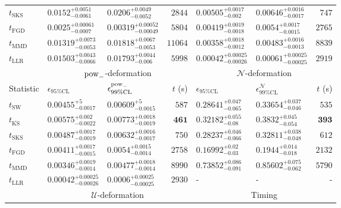 \begin{tabular}{l|llr|llr}
	$t_{\mathrm{SKS}}$ & $0.0152_{-0.0061}^{+0.0051}$ & $0.0206_{-0.0052}^{+0.0049}$ & $2844$ & $0.00505_{-0.002}^{+0.0017}$ & $0.00646_{-0.0017}^{+0.0016}$ & $747$ \\
	$t_{\mathrm{FGD}}$ & ${\mathbf{0.0025_{-0.0007}^{+0.00061}}}$ & ${\mathbf{0.00319_{-0.00049}^{+0.00052}}}$ & $5804$ & $0.00419_{-0.0018}^{+0.0019}$ & $0.0054_{-0.0015}^{+0.0017}$ & $2765$ \\
	$t_{\mathrm{MMD}}$ & $0.01319_{-0.0053}^{+0.0073}$ & $0.01818_{-0.0053}^{+0.0067}$ & $11064$ & ${\mathbf{0.00358_{-0.0012}^{+0.0018}}}$ & ${\mathbf{0.00483_{-0.0013}^{+0.0016}}}$ & $8839$ \\
	$t_{\mathrm{LLR}}$ & $0.01503_{-0.0066}^{+0.0043}$ & $0.01793_{-0.006}^{+0.0044}$ & $5998$ & $0.00042_{-0.00026}^{+0.00025}$ & $0.00061_{-0.00025}^{+0.00025}$ & $2919$ \\
	\toprule
	\multicolumn{1}{c}{} & \multicolumn{3}{c}{$\rm{pow}_{-}$-deformation} & \multicolumn{3}{c}{$\mathcal{N}$-deformation} \\
	Statistic & $\epsilon_{95\%\mathrm{CL}}$ & $\epsilon^  {\rm{pow}_{-}}_{99\%\mathrm{CL}}$ & $t$ (s) & $\epsilon_{95\%\mathrm{CL}}$ & $\epsilon^    {\mathcal{N}}_{99\%\mathrm{CL}}$ & $t$ (s) \\
	\midrule
	$t_{\mathrm{SW}}$ & $0.00455_{-0.0017}^{+5}$ & $0.00609_{-0.0015}^{+5}$ & $587$ & $0.28641_{-0.065}^{+0.047}$ & $0.33654_{-0.046}^{+0.037}$ & $535$ \\
	$t_{\overline{\mathrm{KS}}}$ & $0.00575_{-0.0022}^{+0.002}$ & $0.00773_{-0.0019}^{+0.0018}$ & ${\mathbf{461}}$ & $0.32182_{-0.08}^{+0.055}$ & $0.3832_{-0.054}^{+0.045}$ & ${\mathbf{393}}$ \\
	$t_{\mathrm{SKS}}$ & $0.00487_{-0.0019}^{+0.0017}$ & $0.00632_{-0.0017}^{+0.0016}$ & $750$ & $0.28237_{-0.066}^{+0.046}$ & $0.32811_{-0.048}^{+0.038}$ & $612$ \\
	$t_{\mathrm{FGD}}$ & $0.00411_{-0.0015}^{+0.0017}$ & $0.0054_{-0.0014}^{+0.0015}$ & $2758$ & ${\mathbf{0.16992_{-0.03}^{+0.02}}}$ & ${\mathbf{0.1944_{-0.018}^{+0.014}}}$ & $2132$ \\
	$t_{\mathrm{MMD}}$ & ${\mathbf{0.00346_{-0.0014}^{+0.0019}}}$ & ${\mathbf{0.00477_{-0.0014}^{+0.0018}}}$ & $8990$ & $0.73852_{-0.091}^{+0.086}$ & $0.85602_{-0.062}^{+0.075}$ & $5790$ \\
	$t_{\mathrm{LLR}}$ & $0.00042_{-0.00026}^{+0.00025}$ & $0.0006_{-0.00025}^{+0.00025}$ & $2930$ & - & - & - \\
	\toprule
	\multicolumn{1}{c}{} & \multicolumn{3}{c}{$\mathcal{U}$-deformation} & \multicolumn{3}{c}{Timing} \\

\end{tabular}
